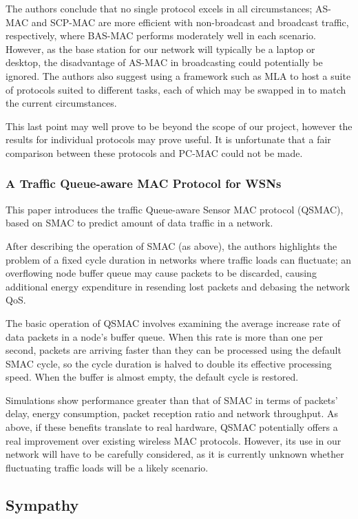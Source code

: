The authors conclude that no single protocol excels in all circumstances; AS-MAC and SCP-MAC are more efficient with non-broadcast and broadcast traffic, respectively, where BAS-MAC performs moderately well in each scenario. However, as the base station for our network will typically be a laptop or desktop, the disadvantage of AS-MAC in broadcasting could potentially be ignored. The authors also suggest using a framework such as MLA to host a suite of protocols suited to different tasks, each of which may be swapped in to match the current circumstances.

This last point may well prove to be beyond the scope of our project, however the results for individual protocols may prove useful. It is unfortunate that a fair comparison between these protocols and PC-MAC could not be made.

\subsubsection*{A Traffic Queue-aware MAC Protocol for WSNs\cite{4469515}}

This paper introduces the traffic Queue-aware Sensor MAC protocol (QSMAC), based on SMAC to predict amount of data traffic in a network.

After describing the operation of SMAC (as above), the authors highlights the problem of a fixed cycle duration in networks where traffic loads can fluctuate; an overflowing node buffer queue may cause packets to be discarded, causing additional energy expenditure in resending lost packets and debasing the network QoS.

The basic operation of QSMAC involves examining the average increase rate of data packets in a node's buffer queue. When this rate is more than one per second, packets are arriving faster than they can be processed using the default SMAC cycle, so the cycle duration is halved to double its effective processing speed. When the buffer is almost empty, the default cycle is restored.

Simulations show performance greater than that of SMAC in terms of packets' delay, energy consumption, packet reception ratio and network throughput. As above, if these benefits translate to real hardware, QSMAC potentially offers a real improvement over existing wireless MAC protocols. However, its use in our network will have to be carefully considered, as it is currently unknown whether fluctuating traffic loads will be a likely scenario.

\subsection{Sympathy}

